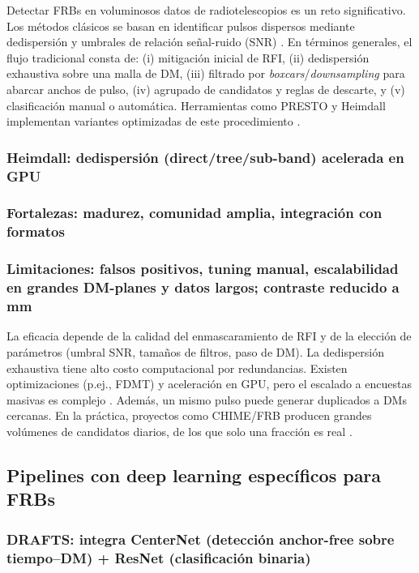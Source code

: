 Detectar FRBs en voluminosos datos de radiotelescopios es un reto significativo. 
Los métodos clásicos se basan en identificar pulsos dispersos mediante de\-dispersión 
y umbrales de relación señal-ruido (SNR) \citep{CordesMcLaughlin2003}. En términos generales, 
el flujo tradicional consta de: (i) mitigación inicial de RFI, (ii) de\-dispersión exhaustiva 
sobre una malla de DM, (iii) filtrado por \textit{boxcars}/\textit{downsampling} para abarcar 
anchos de pulso, (iv) agrupado de candidatos y reglas de descarte, y (v) clasificación manual o 
automática. Herramientas como PRESTO y Heimdall implementan variantes optimizadas de este procedimiento
\citep{Ransom_2003,Barsdell_2012,Heimdall_Use}.

\subsubsection{Heimdall: dedispersión (direct/tree/sub-band) acelerada en GPU}

\subsubsection{Fortalezas: madurez, comunidad amplia, integración con formatos}

\subsubsection{Limitaciones: falsos positivos, tuning manual, escalabilidad en grandes DM-planes y datos largos; contraste reducido a mm}

La eficacia depende de la calidad del enmascaramiento de RFI y de la elección de parámetros 
(umbral SNR, tamaños de filtros, paso de DM). La de\-dispersión exhaustiva tiene alto costo 
computacional por redundancias. Existen optimizaciones (p.ej., FDMT) y aceleración en GPU, pero el 
escalado a encuestas masivas es complejo \citep{Zackay_2014_FDMT,Barsdell_2012}. Además, un mismo 
pulso puede generar duplicados a DMs cercanas. En la práctica, proyectos como CHIME/FRB producen 
grandes volúmenes de candidatos diarios, de los que solo una fracción es real \citep{CHIME2021}.

\subsection{Pipelines con deep learning específicos para FRBs}

\subsubsection{DRAFTS: integra CenterNet (detección anchor-free sobre tiempo--DM) + ResNet (clasificación binaria)}

